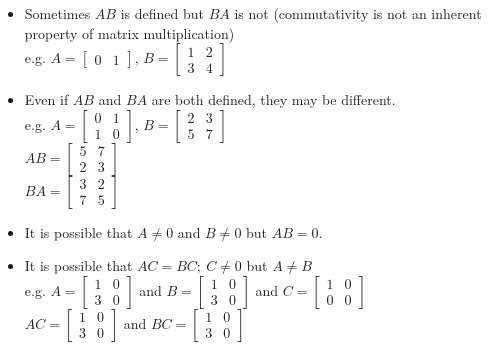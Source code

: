 \documentclass[]{article}
\begin{document}
		\begin{itemize}
			\item Sometimes $AB$ is defined but $BA$ is not (commutativity is not an inherent property of matrix multiplication)\\
			e.g. $A=\begin{bmatrix}{0}&{1}\end{bmatrix}$, $B=\begin{bmatrix}{1}&{2}\\{3}&{4}\end{bmatrix}$
			\item Even if $AB$ and $BA$ are both defined, they may be different.\\
			e.g. $A=\begin{bmatrix}{0}&{1}\\{1}&{0}\end{bmatrix}$, $B=\begin{bmatrix}{2}&{3}\\{5}&{7}\end{bmatrix}$\\
			$AB=\begin{bmatrix}{5}&{7}\\{2}&{3}\end{bmatrix}$\\
			$BA=\begin{bmatrix}{3}&{2}\\{7}&{5}\end{bmatrix}$
			\item It is possible that $A\ne 0$ and $B\ne 0$ but $AB=0$.
			\item It is possible that $AC=BC;~C\ne 0$ but $A\ne B$\\
			e.g. $A=\begin{bmatrix}{1}&{0}\\{3}&{0}\end{bmatrix}$ and $B=\begin{bmatrix}{1}&{0}\\{3}&{0}\end{bmatrix}$ and $C=\begin{bmatrix}{1}&{0}\\{0}&{0}\end{bmatrix}$\\
			$AC=\begin{bmatrix}{1}&{0}\\{3}&{0}\end{bmatrix}$ and $BC=\begin{bmatrix}{1}&{0}\\{3}&{0}\end{bmatrix}$
		\end{itemize}
\end{document}
